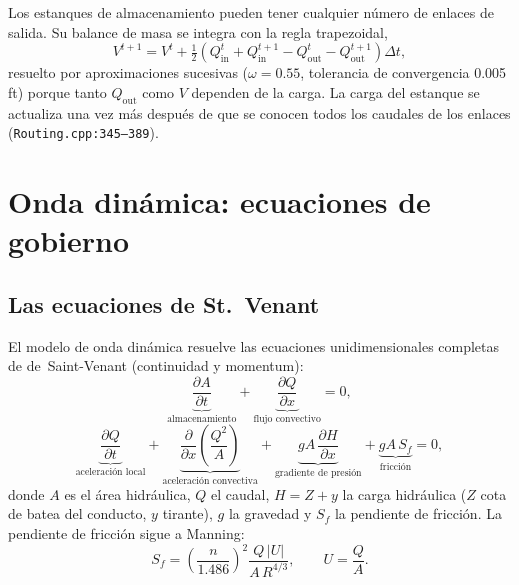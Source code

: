 \documentclass[11pt,a4paper]{article}
\begin{document}
Los estanques de almacenamiento pueden tener cualquier número de enlaces de
salida. Su balance de masa se integra con la regla trapezoidal,
\begin{equation}
  V^{t+1} = V^{t} + \tfrac{1}{2}\left(Q_{\mathrm{in}}^{t} + Q_{\mathrm{in}}^{t+1}
  - Q_{\mathrm{out}}^{t} - Q_{\mathrm{out}}^{t+1}\right)\Delta t,
\end{equation}
resuelto por aproximaciones sucesivas ($\omega = 0.55$, tolerancia de
convergencia 0.005 ft) porque tanto $Q_{\mathrm{out}}$ como $V$ dependen de la
carga. La carga del estanque se actualiza una vez más después de que se
conocen todos los caudales de los enlaces (\texttt{Routing.cpp:345--389}).

\section{Onda dinámica: ecuaciones de gobierno}

\subsection{Las ecuaciones de St.\ Venant}

El modelo de onda dinámica resuelve las ecuaciones unidimensionales completas
de de~Saint-Venant (continuidad y momentum):
\begin{equation}
  \underbrace{\frac{\partial A}{\partial t}}_{\text{almacenamiento}} +
  \underbrace{\frac{\partial Q}{\partial x}}_{\text{flujo convectivo}}
  = 0,
  \label{eq:sv-cont}
\end{equation}
\begin{equation}
  \underbrace{\frac{\partial Q}{\partial t}}_{\text{aceleración local}} +
  \underbrace{\frac{\partial}{\partial x}\!\left(\frac{Q^{2}}{A}\right)}_{\text{aceleración convectiva}}
  + \underbrace{gA\,\frac{\partial H}{\partial x}}_{\text{gradiente de presión}}
  + \underbrace{gA\,S_f}_{\text{fricción}}
  = 0,
  \label{eq:sv-mom}
\end{equation}
donde $A$ es el área hidráulica, $Q$ el caudal, $H = Z + y$ la carga hidráulica
($Z$ cota de batea del conducto, $y$ tirante), $g$ la gravedad y $S_f$ la
pendiente de fricción. La pendiente de fricción sigue a Manning:
\begin{equation}
  S_f = \left(\frac{n}{1.486}\right)^{2}
  \frac{Q\,\lvert U \rvert}{A\,R^{4/3}},
  \qquad U = \frac{Q}{A}.
\end{equation}
\end{document}
